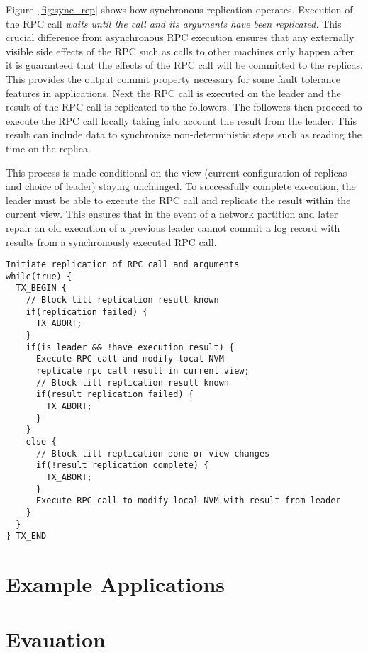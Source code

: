\documentclass[twocolumn]{article}
\begin{document}
Figure~\ref{fig:sync_rep} shows how synchronous replication operates.  Execution
of the RPC call \emph{waits until the call and its arguments have been
  replicated.} This crucial difference from asynchronous RPC execution ensures
that any externally visible side effects of the RPC such as calls to other
machines only happen after it is guaranteed that the effects of the RPC call
will be committed to the replicas. This provides the output commit property
necessary for some fault tolerance features in applications. Next the RPC call
is executed on the leader and the result of the RPC call is replicated to the
followers. The followers then proceed to execute the RPC call locally taking
into account the result from the leader. This result can include data to
synchronize non-deterministic steps such as reading the time on the replica.

This process is made conditional on the view (current configuration of
replicas and choice of leader) staying unchanged. To successfully complete
execution, the leader must be able to execute the RPC call and replicate the
result within the current view. This ensures that in the event of a network
partition and later repair an old execution of a previous leader cannot commit a
log record with results from a synchronously executed RPC call.

\begin{figure*}
{ \scriptsize
\begin{verbatim}
Initiate replication of RPC call and arguments
while(true) {
  TX_BEGIN {
    // Block till replication result known
    if(replication failed) {
      TX_ABORT;
    }  
    if(is_leader && !have_execution_result) {
      Execute RPC call and modify local NVM
      replicate rpc call result in current view;
      // Block till replication result known
      if(result replication failed) {
        TX_ABORT;
      }
    }
    else {
      // Block till replication done or view changes
      if(!result replication complete) {
        TX_ABORT;
      }
      Execute RPC call to modify local NVM with result from leader
    }
  }
} TX_END
\end{verbatim}
}
\caption{Synchronous Replication}
\label{fig:sync_rep}
\end{figure*}


\section{Example Applications}
\label{sec:examples}

\section{Evauation}
\end{document}
